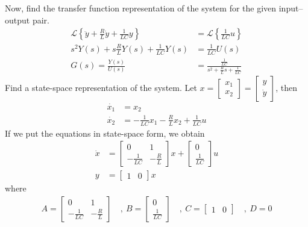 \documentclass[twoside]{article}
\begin{document}
Now, find the transfer function representation of the system for the given input--output pair.
%
\begin{align*}
	\mathcal{L} \left\lbrace \ddot{y} + \frac{R}{L} \dot{y} + \frac{1}{LC} y  \right\rbrace 
	&= \mathcal{L} \left\lbrace \frac{1}{LC} u  \right\rbrace
	\\
	s^2 Y(s) + s \frac{R}{L} Y(s) + \frac{1}{LC} Y(s) &=  \frac{1}{LC} U(s) \\
	G(s) = \frac{Y(s)}{U(s)} &= \frac{\frac{1}{LC} }{s^2 + \frac{R}{L} s + \frac{1}{LC} }
\end{align*}
%
Find a state-space representation of the system.
%
Let $x = \left[ \begin{array}{c} x_1 \\ x_2 \end{array} \right] = \left[ \begin{array}{c} y \\ \dot{y} \end{array} \right]$, then 
%
\begin{align*}
	\dot{x_1} &= x_2 \\
	\dot{x_2} &= -\frac{1}{LC} x_1 - \frac{R}{L} x_2 + \frac{1}{LC} u
\end{align*}
%
If we put the equations in state-space form, we obtain
%
\begin{align*}
 \dot{x} &= \left[  \begin{array}{cc} 0 & 1 \\ -\frac{1}{LC} &  -\frac{R}{L}  \end{array} \right] x 
 +  \left[  \begin{array}{c} 0 \\ \frac{1}{LC} \end{array} \right] u
 \\
 y &= \left[  \begin{array}{cc} 1 & 0 \end{array} \right] x 
\end{align*}
%
where
%
\begin{align*}
 A = \left[  \begin{array}{cc} 0 & 1 \\ -\frac{1}{LC} &  -\frac{R}{L}  \end{array} \right] \quad , \
 B = \left[  \begin{array}{c} 0 \\ \frac{1}{LC} \end{array} \right]  \quad , \
 C = \left[  \begin{array}{cc} 1 & 0 \end{array} \right] \quad , \
 D = 0
\end{align*}
\end{document}
